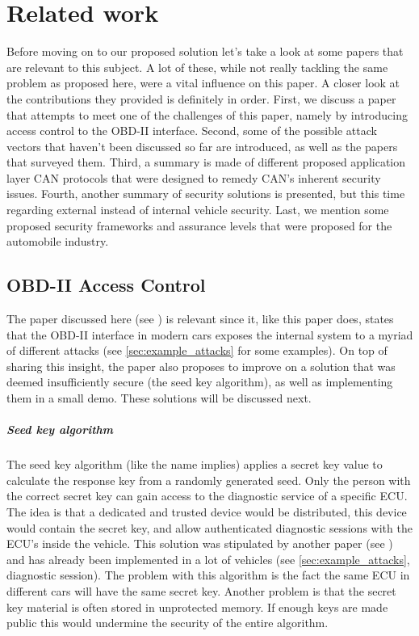 \chapter{Related work}
\label{chap:related_work}

Before moving on to our proposed solution let's take a look at some papers that are relevant to this subject. A lot of these, while not really tackling the same problem as proposed here, were a vital influence on this paper. A closer look at the contributions they provided is definitely in order. First, we discuss a paper that attempts to meet one of the challenges of this paper, namely by introducing access control to the OBD-II interface. Second, some of the possible attack vectors that haven't been discussed so far are introduced, as well as the papers that surveyed them. Third, a summary is made of different proposed application layer CAN protocols that were designed to remedy CAN's inherent security issues. Fourth, another summary of security solutions is presented, but this time regarding external instead of internal vehicle security. Last, we mention some proposed security frameworks and assurance levels that were proposed for the automobile industry.

\section{OBD-II Access Control}
\label{sec:obd_access_control}

The paper discussed here (see \cite{Yadav16}) is relevant since it, like this paper does, states that the OBD-II interface in modern cars exposes the internal system to a myriad of different attacks (see \ref{sec:example_attacks} for some examples). On top of sharing this insight, the paper also proposes to improve on a solution that was deemed insufficiently secure (the seed key algorithm), as well as implementing them in a small demo. These solutions will be discussed next.


\paragraph{Seed key algorithm} The seed key algorithm (like the name implies) applies a secret key value to calculate the response key from a randomly generated seed. Only the person with the correct secret key can gain access to the diagnostic service of a specific ECU. The idea is that a dedicated and trusted device would be distributed, this device would contain the secret key, and allow authenticated diagnostic sessions with the ECU's inside the vehicle. This solution was stipulated by another paper (see \cite{Bayer}) and has already been implemented in a lot of vehicles (see \ref{sec:example_attacks}, diagnostic session). The problem with this algorithm is the fact the same ECU in different cars will have the same secret key. Another problem is that the secret key material is often stored in unprotected memory. If enough keys are made public this would undermine the security of the entire algorithm.  


